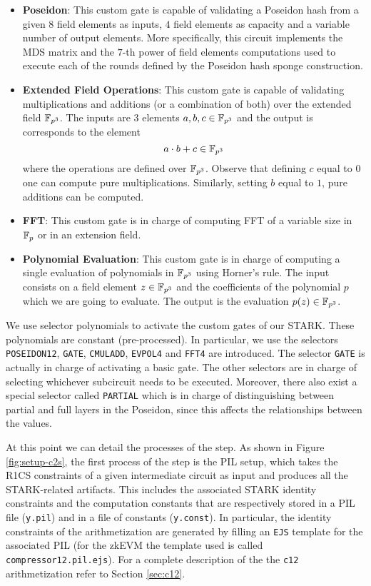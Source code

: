 \begin{itemize}
\item \textbf{Poseidon}: This custom gate is capable of validating a Poseidon hash from a given $8$ field elements as inputs, $4$ field elements as capacity and a variable number of output elements. More specifically, this circuit implements the MDS matrix and the $7$-th power of field elements computations used to execute each of the rounds defined by the Poseidon hash sponge construction. 
\item \textbf{Extended Field Operations}: This custom gate is capable of validating multiplications and additions (or a combination of both) over the extended field $\mathbb{F}_{p^3}$. The inputs are $3$ elements $a, b, c \in \mathbb{F}_{p^3}$ and the output is corresponds to the element 
\[
a \cdot b + c \in \mathbb{F}_{p^3}
\]
where the operations are defined over $\mathbb{F}_{p^3}$. Observe that defining $c$ equal to $0$ one can compute pure multiplications. Similarly, setting $b$ equal to $1$, pure additions can be computed. 

\item \textbf{FFT}: This custom gate is in charge of computing FFT of a variable size in $\mathbb{F}_p$ or in an extension field. 

\item \textbf{Polynomial Evaluation}: This custom gate is in charge of computing a single evaluation of polynomials in $\mathbb{F}_{p^3}$ using Horner's rule. The input consists on a field element $z \in \mathbb{F}_{p^3}$ and the coefficients of the polynomial $p$ which we are going to evaluate. The output is the evaluation $p(z) \in \mathbb{F}_{p^3}$. 
\end{itemize}

We use selector polynomials to activate the custom gates of our STARK. 
These polynomials are constant (pre-processed). In particular, we use the selectors \texttt{POSEIDON12}, \texttt{GATE}, \texttt{CMULADD}, \texttt{EVPOL4} and \texttt{FFT4} are introduced. The selector \texttt{GATE} is actually in charge of activating a basic \plonk gate. The other selectors are in charge of selecting whichever subcircuit needs to be executed. Moreover, there also exist a special selector called \texttt{PARTIAL} which is in charge of distinguishing between partial and full layers in the Poseidon, since this affects the relationships between the values.

At this point we can detail the processes of the \ctos step.
As shown in Figure \ref{fig:setup-c2s}, the first process of the \ctos step is the PIL setup, which takes the R1CS constraints of a given intermediate circuit as input and produces all the STARK-related artifacts.
This includes the associated STARK identity constraints and the computation constants
that are respectively stored in a PIL file (\texttt{y.pil}) and in a file of constants
(\texttt{y.const}).
In particular, the identity constraints of the  arithmetization are generated by filling an \texttt{EJS} template for the associated PIL (for the zkEVM the template used is called \texttt{compressor12.pil.ejs}). For a complete description of the the \texttt{c12} arithmetization refer to Section \ref{sec:c12}.

